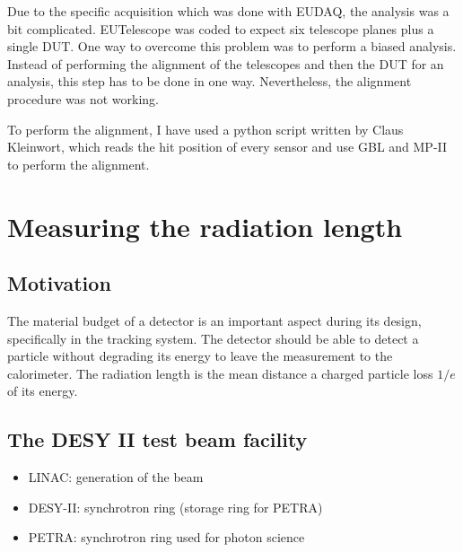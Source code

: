     Due to the specific acquisition which was done with EUDAQ, the analysis was a bit complicated.
    EUTelescope was coded to expect six telescope planes plus a single DUT.
    One way to overcome this problem was to perform a biased analysis.
    Instead of performing the alignment of the telescopes and then the DUT for an analysis, this step has to be done in one way.
    Nevertheless, the alignment procedure was not working.

    To perform the alignment, I have used a python script written by Claus Kleinwort, which reads the hit position of every sensor and use GBL and MP-II to perform the alignment.

    \begin{figure}
    \end{figure}

  \section{Measuring the radiation length}

    \subsection{Motivation}

    The material budget of a detector is an important aspect during its design, specifically in the tracking system.
    The detector should be able to detect a particle without degrading its energy to leave the measurement to the calorimeter.
    The radiation length is the mean distance a charged particle loss $1/e$ of its energy.

    \subsection{The DESY II test beam facility}

    \begin{itemize}
      \item LINAC: generation of the beam
      \item DESY-II: synchrotron ring (storage ring for PETRA)
      \item PETRA: synchrotron ring used for photon science
    \end{itemize}
